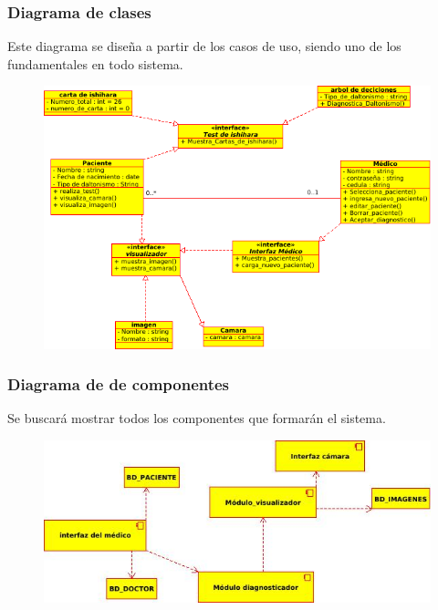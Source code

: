 \documentclass[10pt]{article}
\begin{document}
\newpage

\subsubsection{Diagrama de clases}

Este diagrama se diseña a partir de los casos de uso, siendo uno de los fundamentales en todo sistema.

\begin{figure}[H]
	\begin{center}
\includegraphics[scale = 0.90]{UML/clases.png}
	\end{center} 
\end{figure}

\subsubsection{Diagrama de de componentes}

Se buscará mostrar todos los componentes que formarán el sistema.

\begin{figure}[H]
	\begin{center}
\includegraphics[scale = 0.85]{UML/componentes.jpeg}
	\end{center} 
\end{figure}
\end{document}
